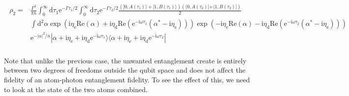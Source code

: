 \documentclass[10pt,fleqn]{article}
\newcommand{\ud}{\mathrm{d}}
\newcommand{\ue}{\mathrm{e}}
\newcommand{\ui}{\mathrm{i}}
\newcommand{\eqar}[1]
{
  \begin{align}
    #1
  \end{align}
}
\newcommand{\paren}[1]{{\left({#1}\right)}}
\newcommand{\abs}[1]{{\left|{#1}\right|}}
\begin{document}
\eqar{
  \begin{split}
    \rho_2=&\frac{\Gamma^2}{\pi {\bar n}}\int_0^\infty\ud\tau_1\ue^{-\Gamma\tau_1/2}\int_0^\infty\ud\tau_2\ue^{-\Gamma\tau_2/2}\frac{\paren{|0,A(\tau_1)\rangle+|1,B(\tau_1)\rangle}\paren{\langle 0,A(\tau_2)|+\langle 1,B(\tau_2)|}}{2}\\
           &\int\ud^2\alpha
             \exp\paren{\ui\eta_{\mathrm{e}}\mathrm{Re}(\alpha)+\ui\eta_{\mathrm{d}}\mathrm{Re}(\ue^{-\ui\omega\tau_1}(\alpha^*-\ui\eta_{\mathrm{e}}))}
             \exp\paren{-\ui\eta_{\mathrm{e}}\mathrm{Re}(\alpha)-\ui\eta_{\mathrm{d}}\mathrm{Re}(\ue^{-\ui\omega\tau_2}(\alpha^*-\ui\eta_{\mathrm{e}}))}\\
           &\ue^{-\abs{\alpha}^2/{\bar n}}|\alpha+\ui\eta_{\mathrm{e}}+\ui\eta_{\mathrm{d}}\ue^{-\ui\omega\tau_1}\rangle
             \langle\alpha+\ui\eta_{\mathrm{e}}+\ui\eta_{\mathrm{d}}\ue^{-\ui\omega\tau_2}|\\
  \end{split}
}
Note that unlike the previous case, the unwanted entanglement create is entirely
between two degrees of freedoms outside the qubit space
and does not affect the fidelity of an atom-photon entanglement fidelity.
To see the effect of this, we need to look at the state of the two atoms combined.
\end{document}
